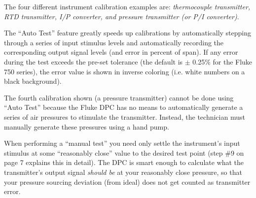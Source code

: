 







The four different instrument calibration examples are: {\it thermocouple transmitter, RTD transmitter, I/P converter, and pressure transmitter (or P/I converter)}.

\vskip 10pt

The ``Auto Test'' feature greatly speeds up calibrations by automatically stepping through a series of input stimulus levels and automatically recording the corresponding output signal levels (and error in percent of span).  If any error during the test exceeds the pre-set tolerance (the default is $\pm$ 0.25\% for the Fluke 750 series), the error value is shown in inverse coloring (i.e. white numbers on a black background).

\vskip 10pt

The fourth calibration shown (a pressure transmitter) cannot be done using ``Auto Test'' because the Fluke DPC has no means to automatically generate a series of air pressures to stimulate the transmitter.  Instead, the technician must manually generate these pressures using a hand pump.

\vskip 10pt

When performing a ``manual test'' you need only settle the instrument's input stimulus at some ``reasonably close'' value to the desired test point (step \#9 on page 7 explains this in detail).  The DPC is smart enough to calculate what the transmitter's output signal {\it should be} at your reasonably close pressure, so that your pressure sourcing deviation (from ideal) does not get counted as transmitter error.










